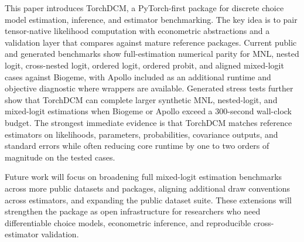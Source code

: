 This paper introduces TorchDCM, a PyTorch-first package for discrete choice model estimation, inference, and estimator benchmarking.
The key idea is to pair tensor-native likelihood computation with econometric abstractions and a validation layer that compares against mature reference packages.
Current public and generated benchmarks show full-estimation numerical parity for MNL, nested logit, cross-nested logit, ordered logit, ordered probit, and aligned mixed-logit cases against Biogeme, with Apollo included as an additional runtime and objective diagnostic where wrappers are available.
Generated stress tests further show that TorchDCM can complete larger synthetic MNL, nested-logit, and mixed-logit estimations when Biogeme or Apollo exceed a 300-second wall-clock budget.
The strongest immediate evidence is that TorchDCM matches reference estimators on likelihoods, parameters, probabilities, covariance outputs, and standard errors while often reducing core runtime by one to two orders of magnitude on the tested cases.

Future work will focus on broadening full mixed-logit estimation benchmarks across more public datasets and packages, aligning additional draw conventions across estimators, and expanding the public dataset suite.
These extensions will strengthen the package as open infrastructure for researchers who need differentiable choice models, econometric inference, and reproducible cross-estimator validation.
